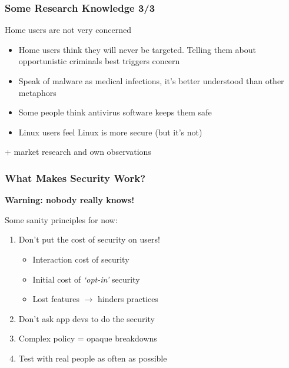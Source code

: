 \begin{frame}
\frametitle{Some Research Knowledge 3/3}
	\begin{block}{Home users are not very concerned}
	\begin{itemize}
	\item Home users think they will never be targeted. Telling them about opportunistic criminals best triggers concern
	\item Speak of malware as medical infections, it's better understood than other metaphors
	\item Some people think antivirus software keeps them safe
	\item Linux users feel Linux is more secure (but it's not)
	\end{itemize}
	\end{block}

	{\scriptsize\color{xorg-palette-dark}\cite{camp_mental_2006,wash_folk_2010,krol_dont_2012} + market research and own observations}
\end{frame}




\begin{frame}
\frametitle{What Makes Security Work?}

\textbf{Warning: nobody really knows!}

    \begin{block}{Some sanity principles for now:}
    \begin{enumerate}
    \item Don't put the cost of security on users!
    	\begin{itemize}
    	\item Interaction cost of security
    	\item Initial cost of \textit{`opt-in'} security
    	\item Lost features $\rightarrow$ hinders practices
    	\end{itemize}
    \item Don't ask app devs to do the security
    \item Complex policy = opaque breakdowns
    \item Test with real people as often as possible
    \end{enumerate}
    \end{block}
\end{frame}






